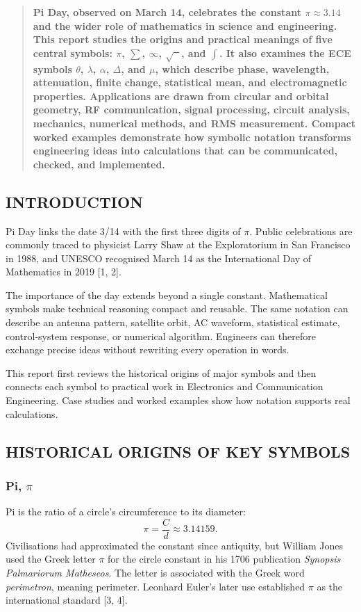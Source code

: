 \begin{multicols}{2}
  \begin{abstract}
    \bfseries
    Pi Day, observed on March 14, celebrates the constant $\pi\approx3.14$ and the wider role of mathematics in science and engineering. This report studies the origins and practical meanings of five central symbols: $\pi$, $\sum$, $\infty$, $\sqrt{\phantom{x}}$, and $\int$. It also examines the ECE symbols $\theta$, $\lambda$, $\alpha$, $\Delta$, and $\mu$, which describe phase, wavelength, attenuation, finite change, statistical mean, and electromagnetic properties. Applications are drawn from circular and orbital geometry, RF communication, signal processing, circuit analysis, mechanics, numerical methods, and RMS measurement. Compact worked examples demonstrate how symbolic notation transforms engineering ideas into calculations that can be communicated, checked, and implemented.
  \end{abstract}

  \subsection*{\centering\uppercase{Introduction}}
  Pi Day links the date 3/14 with the first three digits of $\pi$. Public celebrations are commonly traced to physicist Larry Shaw at the Exploratorium in San Francisco in 1988, and UNESCO recognised March 14 as the International Day of Mathematics in 2019 [1, 2].

  \noindent
  The importance of the day extends beyond a single constant. Mathematical symbols make technical reasoning compact and reusable. The same notation can describe an antenna pattern, satellite orbit, AC waveform, statistical estimate, control-system response, or numerical algorithm. Engineers can therefore exchange precise ideas without rewriting every operation in words.

  \noindent
  This report first reviews the historical origins of major symbols and then connects each symbol to practical work in Electronics and Communication Engineering. Case studies and worked examples show how notation supports real calculations.

  \subsection*{\centering\uppercase{Historical Origins of Key Symbols}}
  \subsubsection*{Pi, $\pi$}
  Pi is the ratio of a circle's circumference to its diameter:
  \[
    \pi=\frac{C}{d}\approx3.14159.
  \]
  Civilisations had approximated the constant since antiquity, but William Jones used the Greek letter $\pi$ for the circle constant in his 1706 publication \textit{Synopsis Palmariorum Matheseos}. The letter is associated with the Greek word \textit{perimetron}, meaning perimeter. Leonhard Euler's later use established $\pi$ as the international standard [3, 4].


\end{multicols}
